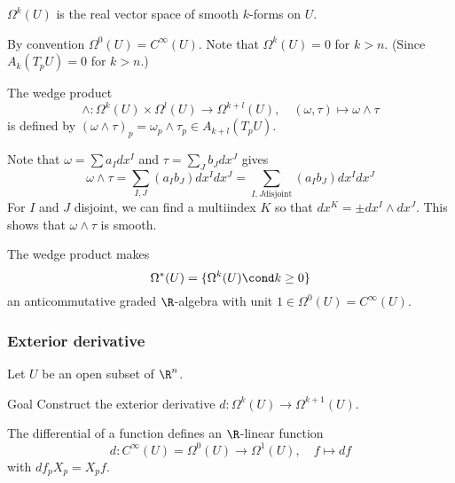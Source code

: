 \begin{frame}
  \begin{defn}
    $\Omega^k(U)$ is the real vector space of smooth $k$-forms on $U$.
  \end{defn}
  By convention $\Omega^0(U) = C^{\infty}(U)$. Note that $\Omega^k(U) = 0$
  for $k > n$. (Since $A_k(T_pU) = 0$ for $k > n$.)
  \begin{defn}
    The wedge product
    \begin{displaymath}
      \wedge \colon \Omega^k(U) \times \Omega^l(U) \to \Omega^{k+l}(U),
      \quad (\omega, \tau) \mapsto \omega \wedge \tau
    \end{displaymath}
    is defined by $(\omega \wedge \tau)_p = \omega_p \wedge \tau_p \in
    A_{k+l}(T_pU)$.
  \end{defn}
  Note that $\omega = \sum a_Idx^I$ and 
  $\tau = \sum_J b_J dx^J$
  gives 
  \begin{displaymath}
    \omega \wedge \tau =
    \sum_{I, J} (a_I b_J) dx^I dx^J 
    =
    \sum_{I, J \text{disjoint}} (a_I b_J) dx^I dx^J 
  \end{displaymath}
  For $I$ and $J$ disjoint, we can find a multiindex $K$ so that 
  $dx^K = \pm dx^I \wedge dx^J$. This shows that $\omega \wedge \tau$ is
  smooth.
\end{frame}
\begin{frame}
  \begin{prop}
    The wedge product makes 
    \begin{displaymath}
      \Omega^*(U) = \{\Omega^k(U) \cond k \ge 0 \}
    \end{displaymath}
    an anticommutative graded $\R$-algebra with unit $1 \in \Omega^0(U) =
    C^{\infty}(U).$
  \end{prop}
\end{frame}
\begin{frame}
  \frametitle{Exterior derivative}
  Let $U$ be an open subset of $\R^n$.
  \begin{block}
    {Goal}
    Construct the exterior derivative $d \colon \Omega^k(U) \to 
    \Omega^{k+1}(U)$.
  \end{block}
  The differential of a function defines an $\R$-linear function
  \begin{displaymath}
    d \colon C^{\infty}(U) = \Omega^0(U) \to \Omega^1(U), \quad f \mapsto df
  \end{displaymath}
  with $df_p X_p = X_p f$.
\end{frame}
